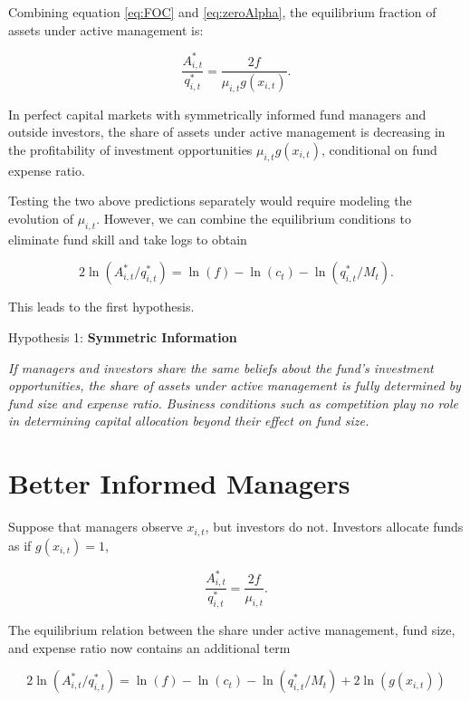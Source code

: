 \documentclass[openany]{book}
\theoremstyle{definition}
\theoremstyle{definition}
\theoremstyle{definition}
\theoremstyle{remark}
\begin{document}
Combining equation \eqref{eq:FOC} and \eqref{eq:zeroAlpha}, the equilibrium
fraction of assets under active management is:

\begin{equation}
\frac{A_{i,t}^\ast}{q_{i,t}^\ast}=\frac{2f}{\mu_{i,t}g(x_{i,t})}.
\label{eq:capMkt}
\end{equation}

In perfect capital markets with symmetrically informed fund managers and
outside investors, the share of assets under active management is
decreasing in the profitability of investment opportunities
\(\mu_{i,t}g(x_{i,t})\), conditional on fund expense ratio.

Testing the two above predictions separately would require modeling the
evolution of \(\mu_{i,t}\). However, we can combine the equilibrium
conditions to eliminate fund skill and take logs to obtain

\begin{equation}
2\ln(A_{i,t}^\ast/q^\ast_{i,t})=\ln(f) - \ln(c_t) - \ln(q^\ast_{i,t}/M_t).
\label{eq:csEq}
\end{equation}

This leads to the first hypothesis.

Hypothesis 1: \textbf{Symmetric Information}

\emph{If managers and investors share the same beliefs about the fund's
investment opportunities, the share of assets under active management is
fully determined by fund size and expense ratio. Business conditions
such as competition play no role in determining capital allocation
beyond their effect on fund size.}

\section{Better Informed Managers}\label{better-informed-managers}

Suppose that managers observe \(x_{i,t}\), but investors do not.
Investors allocate funds as if \(g(x_{i,t})=1\),

\begin{equation}
\frac{A_{i,t}^\ast}{q_{i,t}^\ast}=\frac{2f}{\mu_{i,t}}.
\end{equation}

The equilibrium relation between the share under active management, fund
size, and expense ratio now contains an additional term

\begin{equation}
2\ln(A_{i,t}^\ast/q^\ast_{i,t})=\ln(f) - \ln(c_t) - \ln(q^\ast_{i,t}/M_t) + 2\ln(g(x_{i,t}))
\label{eq:csEQa}
\end{equation}
\end{document}
